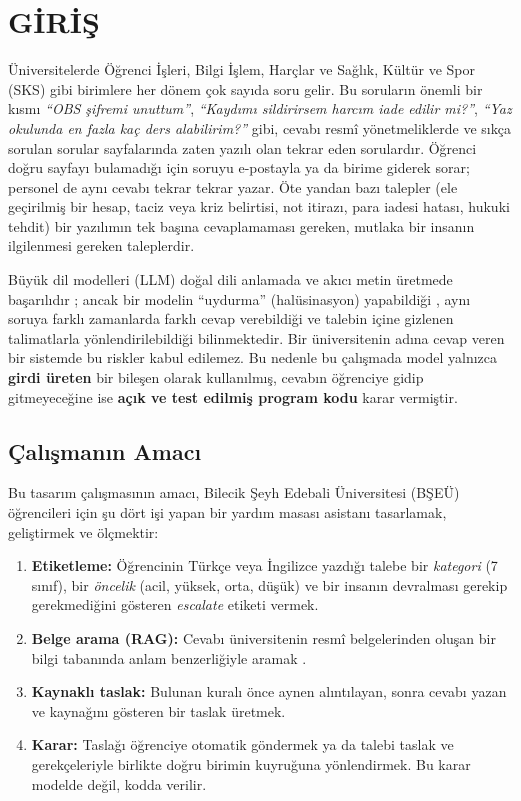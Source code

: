 \chapter{GİRİŞ}

Üniversitelerde Öğrenci İşleri, Bilgi İşlem, Harçlar ve Sağlık, Kültür ve Spor (SKS) gibi birimlere
her dönem çok sayıda soru gelir. Bu soruların önemli bir kısmı \textit{``OBS şifremi unuttum''},
\textit{``Kaydımı sildirirsem harcım iade edilir mi?''}, \textit{``Yaz okulunda en fazla kaç ders
alabilirim?''} gibi, cevabı resmî yönetmeliklerde ve sıkça sorulan sorular sayfalarında zaten yazılı
olan tekrar eden sorulardır. Öğrenci doğru sayfayı bulamadığı için soruyu e-postayla ya da birime
giderek sorar; personel de aynı cevabı tekrar tekrar yazar. Öte yandan bazı talepler (ele geçirilmiş
bir hesap, taciz veya kriz belirtisi, not itirazı, para iadesi hatası, hukuki tehdit) bir yazılımın
tek başına cevaplamaması gereken, mutlaka bir insanın ilgilenmesi gereken taleplerdir.

Büyük dil modelleri (LLM) doğal dili anlamada ve akıcı metin üretmede başarılıdır
\cite{brown2020,vaswani2017}; ancak bir modelin ``uydurma'' (halüsinasyon) yapabildiği
\cite{ji2023}, aynı soruya farklı zamanlarda farklı cevap verebildiği ve talebin içine gizlenen
talimatlarla yönlendirilebildiği \cite{greshake2023,perez2022} bilinmektedir. Bir üniversitenin adına
cevap veren bir sistemde bu riskler kabul edilemez. Bu nedenle bu çalışmada model yalnızca
\textbf{girdi üreten} bir bileşen olarak kullanılmış, cevabın öğrenciye gidip gitmeyeceğine ise
\textbf{açık ve test edilmiş program kodu} karar vermiştir.

\section{Çalışmanın Amacı}

Bu tasarım çalışmasının amacı, Bilecik Şeyh Edebali Üniversitesi (BŞEÜ) öğrencileri için şu dört
işi yapan bir yardım masası asistanı tasarlamak, geliştirmek ve ölçmektir:

\begin{enumerate}
  \item \textbf{Etiketleme:} Öğrencinin Türkçe veya İngilizce yazdığı talebe bir \textit{kategori}
        (7 sınıf), bir \textit{öncelik} (acil, yüksek, orta, düşük) ve bir insanın devralması gerekip
        gerekmediğini gösteren \textit{escalate} etiketi vermek.
  \item \textbf{Belge arama (RAG):} Cevabı üniversitenin resmî belgelerinden oluşan bir bilgi
        tabanında anlam benzerliğiyle aramak \cite{lewis2020,gao2023}.
  \item \textbf{Kaynaklı taslak:} Bulunan kuralı önce aynen alıntılayan, sonra cevabı yazan ve
        kaynağını gösteren bir taslak üretmek.
  \item \textbf{Karar:} Taslağı öğrenciye otomatik göndermek ya da talebi taslak ve gerekçeleriyle
        birlikte doğru birimin kuyruğuna yönlendirmek. Bu karar modelde değil, kodda verilir.
\end{enumerate}

